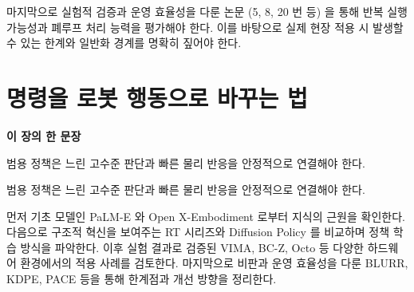 \documentclass[11pt,openany]{book}
\newcommand{\chaptertakeaway}[1]{%
  \begin{tcolorbox}[
    breakable,
    colback=deepblue,
    colframe=deepblue,
    coltext=white,
    boxrule=0pt,
    arc=2mm,
    left=5mm,right=5mm,top=4mm,bottom=4mm
  ]
  {\sffamily\bfseries\large 이 장의 한 문장}\par\smallskip
  #1
  \end{tcolorbox}
}
\begin{document}
\begin{translationbox}[이 장을 덮기 전에]

마지막으로 실험적 검증과 운영 효율성을 다룬 논문 (5, 8, 20 번 등) 을 통해 반복 실행 가능성과 폐루프 처리 능력을 평가해야 한다. 이를 바탕으로 실제 현장 적용 시 발생할 수 있는 한계와 일반화 경계를 명확히 짚어야 한다.

\end{translationbox}

\cleardoublepage

\chapter{명령을 로봇 행동으로 바꾸는 법}

\chaptertakeaway{범용 정책은 느린 고수준 판단과 빠른 물리 반응을 안정적으로 연결해야 한다.}

범용 정책은 느린 고수준 판단과 빠른 물리 반응을 안정적으로 연결해야 한다.

\begin{boardbox}[읽는 순서]

먼저 기초 모델인 PaLM-E 와 Open X-Embodiment 로부터 지식의 근원을 확인한다. 다음으로 구조적 혁신을 보여주는 RT 시리즈와 Diffusion Policy 를 비교하며 정책 학습 방식을 파악한다. 이후 실험 결과로 검증된 VIMA, BC-Z, Octo 등 다양한 하드웨어 환경에서의 적용 사례를 검토한다. 마지막으로 비판과 운영 효율성을 다룬 BLURR, KDPE, PACE 등을 통해 한계점과 개선 방향을 정리한다.

\end{boardbox}
\end{document}
